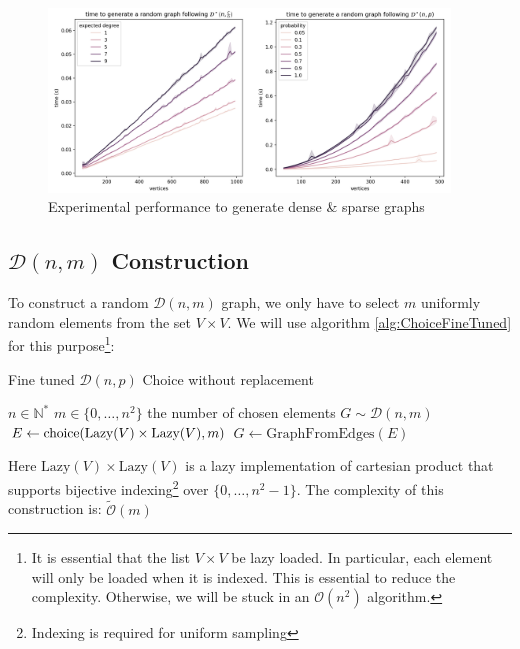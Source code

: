 \begin{figure}[H]
	\centering
	\includegraphics[width=0.95\textwidth]{Figures/GraphGen.png}
	\caption{Experimental performance to generate dense \& sparse graphs}
\end{figure}
\FloatBarrier

\subsection{$\mathcal{D}(n,m)$ Construction}
To construct a random $\mathcal{D}(n,m)$ graph, we only have to select $m$ uniformly random elements from the set $V\times V.$
\newline We will use algorithm \ref{alg:ChoiceFineTuned} for this purpose\footnote{It is essential that the list $V\times V$ be lazy loaded. In particular, each element will only be loaded when it is indexed. This is essential to reduce the complexity. Otherwise, we will be stuck in an $\mathcal{O}(n^2)$ algorithm.}:
\begin{algorithm}
	\caption{Fine tuned $\mathcal{D}(n,p)$ Choice without replacement }\label{Dnm} 
	\begin{algorithmic}
		\Require $n\in\mathbb{N}^*$
		\Require $m\in\{0,\dots,n^2\}$ the number of chosen elements
		\Ensure $G\sim \mathcal{D}(n,m)$
		\State $E\leftarrow \operatorname{choice}(\text{Lazy}(V)\times \text{Lazy}(V),m)$ 
		\State \Return $G\leftarrow \text{GraphFromEdges}(E)$
	\end{algorithmic}
\end{algorithm}
\FloatBarrier
Here $\text{Lazy}(V)\times \text{Lazy}(V)$ is a lazy implementation of cartesian product that supports bijective indexing\footnote{Indexing is required for uniform sampling} over $\{0,\dots,n^2-1\}.$
\newline The complexity of this construction is: $
\tilde{\mathcal{O}}(m)
$ 

